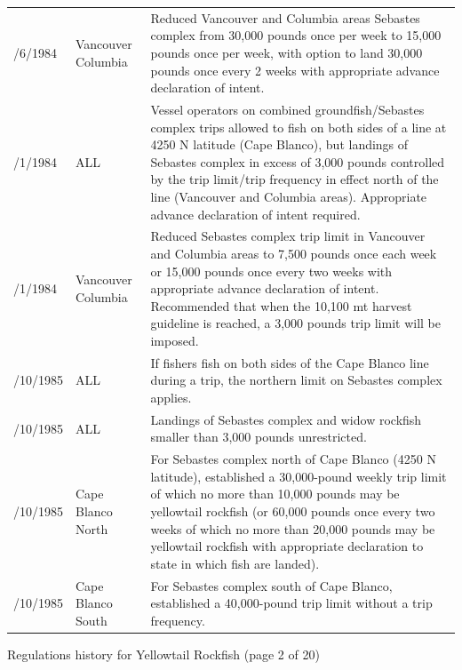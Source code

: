 \documentclass[12pt,]{article}
\begin{document}
\begin{tabular}{>{\centering}p{.60in}>{\centering}p{1.0in}>{\raggedright}p{4.20in}}
  5/6/1984 & Vancouver Columbia & Reduced Vancouver and Columbia areas Sebastes complex from 30,000 pounds once per week to 15,000 pounds once per week, with option to land 30,000 pounds once every 2 weeks with appropriate advance declaration of intent.  \\ 
  8/1/1984 & ALL & Vessel operators on combined groundfish/Sebastes complex trips allowed to fish on both sides of a line at 4250 N latitude (Cape Blanco), but landings of Sebastes complex in excess of 3,000 pounds controlled by the trip limit/trip frequency in effect north of the line (Vancouver and Columbia areas). Appropriate advance declaration of intent required. \\ 
  8/1/1984 & Vancouver Columbia & Reduced Sebastes complex trip limit in Vancouver and Columbia areas to 7,500 pounds once each week or 15,000 pounds once every two weeks with appropriate advance declaration of intent. Recommended that when the 10,100 mt harvest guideline is reached, a 3,000 pounds trip limit will be imposed.  \\ 
  1/10/1985 & ALL & If fishers fish on both sides of the Cape Blanco line during a trip, the northern limit on Sebastes complex applies.  \\ 
  1/10/1985 & ALL & Landings of Sebastes complex and widow rockfish smaller than 3,000 pounds unrestricted.  \\ 
  1/10/1985 & Cape Blanco North & For Sebastes complex north of Cape Blanco (4250 N latitude), established a 30,000-pound weekly trip limit of which no more than 10,000 pounds may be yellowtail rockfish (or 60,000 pounds once every two weeks of which no more than 20,000 pounds may be yellowtail rockfish with appropriate declaration to state in which fish are landed).  \\ 
  1/10/1985 & Cape Blanco South & For Sebastes complex south of Cape Blanco, established a 40,000-pound trip limit without a trip frequency.  \\ 
   \hline
\end{tabular}

\endgroup
\newpage
Regulations history for Yellowtail Rockfish (page 2 of 20)
\begingroup\fontsize{9pt}{10pt}\selectfont
\end{document}
